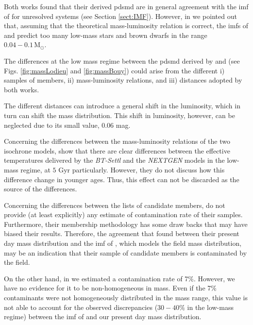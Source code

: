 Both works found that their derived \gls{pdsmd} are in general agreement with the \gls{imf} of \citet{Chabrier2005} for unresolved systems (see Section \ref{sect:IMF}). However, in \citet{Bouy2015} we pointed out that, assuming that the theoretical mass-luminosity relation is correct, the \glspl{imf} of \citet{Chabrier2005} and \citet{Thies2007} predict too many low-mass stars and brown dwarfs in the range $0.04-0.1\,\mathrm{M_{\odot}}$. 

The differences at the low mass regime between the \gls{pdsmd} derived by \citet{Lodieu2012} and \citet{Bouy2015} (see Figs. \ref{fig:massLodieu} and \ref{fig:massBouy}) could arise from the different i) samples of members, ii) mass-luminosity relations, and iii) distances adopted by both works.

The different distances can introduce a general shift in the luminosity, which in turn can shift the mass distribution. This shift in luminosity, however, can be neglected due to its small value, $0.06$ mag.

Concerning the differences between the mass-luminosity relations of the two isochrone models, \citet{2013MmSAI..84.1053A} show that there are clear differences between the effective temperatures delivered by the \emph{BT-Settl} and the \emph{NEXTGEN} models in the low-mass regime, at $5$ Gyr particularly. {However, they do not discuss how this difference change in younger ages. Thus, this effect can not be discarded as the source of the differences.}

Concerning the differences between the lists of candidate members, \citet{Lodieu2012} do not provide (at least explicitly) any estimate of contamination rate of their samples. Furthermore, their membership methodology has some draw backs \cite[see][]{Sarro2014} that may have biased their results. {Therefore, the agreement that \citet{Lodieu2012} found between their present day mass distribution and the \gls{imf} of \citet{Chabrier2005}, which models the field mass distribution, may be an indication that their sample of candidate members is contaminated by the field.  }

On the other hand, in \citet{Bouy2015} we estimated a contamination rate of 7\%. However, we have no evidence for it to be non-homogeneous in mass. Even if the 7\% contaminants were not homogeneously distributed in the mass range, this value is not able to account for the observed discrepancies ($30-40\%$ in the low-mass regime) between the \gls{imf} of \citet{Chabrier2005} and our present day mass distribution.

